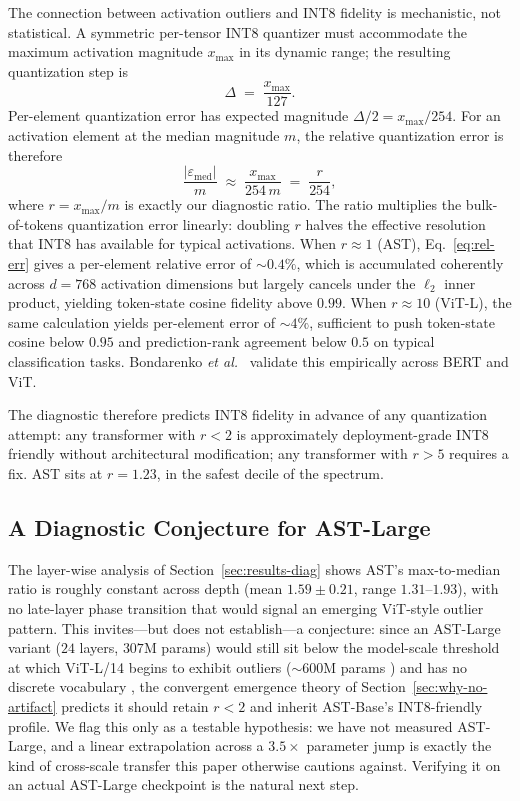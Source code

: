 \documentclass[conference]{IEEEtran}
\begin{document}
The connection between activation outliers and INT8 fidelity is mechanistic, not statistical. A symmetric per-tensor INT8 quantizer must accommodate the maximum activation magnitude $x_{\max}$ in its dynamic range; the resulting quantization step is
\begin{equation}
\Delta \;=\; \frac{x_{\max}}{127}.
\end{equation}
Per-element quantization error has expected magnitude $\Delta / 2 = x_{\max}/254$. For an activation element at the median magnitude $m$, the relative quantization error is therefore
\begin{equation}
\frac{|\varepsilon_{\text{med}}|}{m} \;\approx\; \frac{x_{\max}}{254\,m} \;=\; \frac{r}{254},
\label{eq:rel-err}
\end{equation}
where $r = x_{\max}/m$ is exactly our diagnostic ratio. The ratio multiplies the bulk-of-tokens quantization error linearly: doubling $r$ halves the effective resolution that INT8 has available for typical activations. When $r \approx 1$ (AST), Eq.~\ref{eq:rel-err} gives a per-element relative error of $\sim 0.4\%$, which is accumulated coherently across $d=768$ activation dimensions but largely cancels under the $\ell_2$ inner product, yielding token-state cosine fidelity above $0.99$. When $r \approx 10$ (ViT-L), the same calculation yields per-element error of $\sim 4\%$, sufficient to push token-state cosine below $0.95$ and prediction-rank agreement below $0.5$ on typical classification tasks. Bondarenko \emph{et al.}~\cite{bondarenko2023quantizable} validate this empirically across BERT and ViT.

The diagnostic therefore predicts INT8 fidelity in advance of any quantization attempt: any transformer with $r < 2$ is approximately deployment-grade INT8 friendly without architectural modification; any transformer with $r > 5$ requires a fix. AST sits at $r=1.23$, in the safest decile of the spectrum.

\subsection{A Diagnostic Conjecture for AST-Large}
\label{sec:int8-extrapolate}

The layer-wise analysis of Section~\ref{sec:results-diag} shows AST's max-to-median ratio is roughly constant across depth (mean $1.59 \pm 0.21$, range $1.31$--$1.93$), with no late-layer phase transition that would signal an emerging ViT-style outlier pattern. This invites---but does not establish---a conjecture: since an AST-Large variant ($24$ layers, $307$M params) would still sit below the model-scale threshold at which ViT-L/14 begins to exhibit outliers ($\sim 600$M params \cite{darcet2024need}) and has no discrete vocabulary \cite{puccetti2022outlier,sun2024massive}, the convergent emergence theory of Section~\ref{sec:why-no-artifact} predicts it should retain $r < 2$ and inherit AST-Base's INT8-friendly profile. We flag this only as a testable hypothesis: we have not measured AST-Large, and a linear extrapolation across a $3.5\times$ parameter jump is exactly the kind of cross-scale transfer this paper otherwise cautions against. Verifying it on an actual AST-Large checkpoint is the natural next step.
\end{document}
